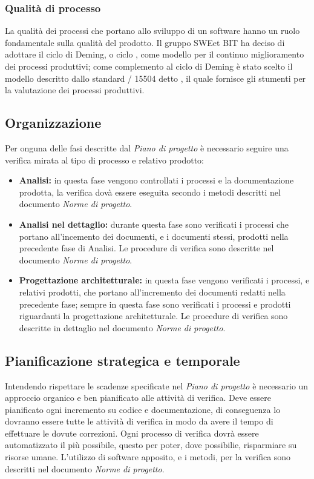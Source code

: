     \subsubsection{Qualità di processo}
    La qualità dei processi che portano allo sviluppo di un software hanno un ruolo fondamentale sulla qualità del prodotto.
    Il gruppo SWEet BIT ha deciso di adottare il ciclo di Deming, o ciclo , come modello per il continuo miglioramento dei processi produttivi;
    come complemento al ciclo di Deming è stato scelto il modello descritto dallo standard / 15504 detto ,
    il quale fornisce gli stumenti per la valutazione dei processi produttivi.

  \subsection{Organizzazione}
    Per onguna delle fasi descritte dal \emph{Piano di progetto} è necessario seguire una verifica mirata al tipo di processo e relativo prodotto:
    \begin{itemize}
      \item \textbf{Analisi:} in questa fase vengono controllati i processi e la documentazione prodotta,
      la verifica dovà essere eseguita secondo i metodi descritti nel documento \emph{Norme di progetto}.
      \item \textbf{Analisi nel dettaglio:} durante questa fase sono verificati i processi che portano all'incemento dei documenti, e i documenti stessi, prodotti nella precedente fase di Analisi.
      Le procedure di verifica sono descritte nel documento \emph{Norme di progetto}.
      \item \textbf{Progettazione architetturale:} in questa fase vengono verificati i processi, e relativi prodotti, che portano all'incremento dei documenti redatti nella precedente fase;
      sempre in questa fase sono verificati i processi e prodotti riguardanti la progettazione architetturale.
      Le procedure di verifica sono descritte in dettaglio nel documento \emph{Norme di progetto}.
    \end{itemize}

  \subsection{Pianificazione strategica e temporale}
    Intendendo rispettare le scadenze specificate nel \emph{Piano di progetto} è necessario un approccio organico e ben pianificato alle attività di verifica.
    Deve essere pianificato ogni incremento su codice e documentazione, di conseguenza lo dovranno essere tutte le attività di verifica
    in modo da avere il tempo di effettuare le dovute correzioni. Ogni processo di verifica dovrà essere automatizzato il più possibile, questo per poter, dove possibilie,
    risparmiare su risorse umane. L'utilizzo di software apposito, e i metodi, per la verifica sono descritti nel documento \emph{Norme di progetto}.

